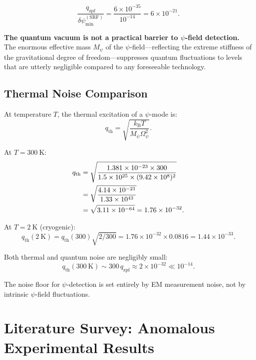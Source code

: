 \documentclass[aps,prd,twocolumn,showpacs,preprintnumbers,superscriptaddress,nofootinbib]{revtex4-2}
\newcommand{\kB}{k_{\mathrm{B}}}
\newcommand{\Mpsi}{M_\psi}
\newcommand{\Opsi}{\Omega_\psi}
\begin{document}
\begin{equation}
\boxed{\frac{q_{\mathrm{zpf}}}{\delta\psi_{\min}^{(\mathrm{SRF})}}
  = \frac{6\times 10^{-35}}{10^{-14}} = 6\times 10^{-21}.}
\end{equation}

\textbf{The quantum vacuum is not a practical barrier to
$\psi$-field detection.}  The enormous effective mass $\Mpsi$ of the
$\psi$-field---reflecting the extreme stiffness of the gravitational
degree of freedom---suppresses quantum fluctuations to levels that are
utterly negligible compared to any foreseeable technology.

\subsection{Thermal Noise Comparison}\label{sec:thermal-noise}

At temperature $T$, the thermal excitation of a $\psi$-mode is:
\begin{equation}
q_{\mathrm{th}} = \sqrt{\frac{\kB T}{\Mpsi\Opsi^2}}.
\end{equation}

At $T = 300~\mathrm{K}$:
\begin{align}
q_{\mathrm{th}} &= \sqrt{\frac{1.381\times 10^{-23}\times 300}{1.5\times 10^{25}\times (9.42\times 10^8)^2}} \notag\\
  &= \sqrt{\frac{4.14\times 10^{-21}}{1.33\times 10^{43}}} \notag\\
  &= \sqrt{3.11\times 10^{-64}} = 1.76\times 10^{-32}.
\end{align}

At $T = 2~\mathrm{K}$ (cryogenic):
\begin{equation}
q_{\mathrm{th}}(2~\mathrm{K}) = q_{\mathrm{th}}(300)\sqrt{2/300}
  = 1.76\times 10^{-32}\times 0.0816 = 1.44\times 10^{-33}.
\end{equation}

Both thermal and quantum noise are negligibly small:
\begin{equation}
q_{\mathrm{th}}(300~\mathrm{K}) \sim 300\,q_{\mathrm{zpf}}
  \approx 2\times 10^{-32} \ll 10^{-14}.
\end{equation}

The noise floor for $\psi$-detection is set entirely by EM measurement
noise, not by intrinsic $\psi$-field fluctuations.

\section{Literature Survey: Anomalous Experimental Results}\label{sec:literature}
\end{document}

